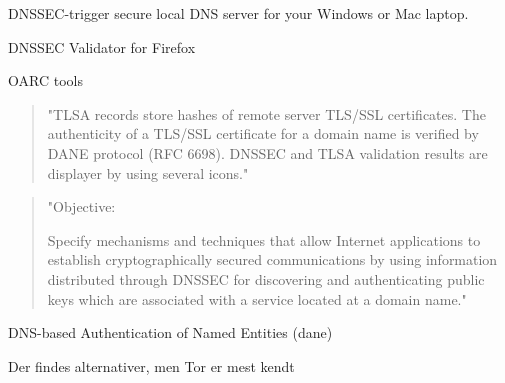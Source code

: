 \documentclass[Screen16to9,17pt]{foils}
\begin{document}


DNSSEC-trigger secure local DNS server for your Windows or Mac laptop.

\begin{list2}
\item DNSSEC Validator for Firefox\\ 
\item OARC tools 
\item {}
\end{list2}



\begin{quote}
"TLSA records store hashes of remote server TLS/SSL certificates. The authenticity of a TLS/SSL certificate for a domain name is verified by DANE protocol (RFC 6698). DNSSEC and TLSA validation results are displayer by using several icons."
\end{quote}



\begin{quote}
"Objective:

Specify mechanisms and techniques that allow Internet applications to
establish cryptographically secured communications by using information
distributed through DNSSEC for discovering and authenticating public
keys which are associated with a service located at a domain name."
\end{quote}

\begin{list1}
\item DNS-based Authentication of Named Entities (dane)
\end{list1}



\centerline{}

\centerline{Der findes alternativer, men Tor er mest kendt}


\end{document}
